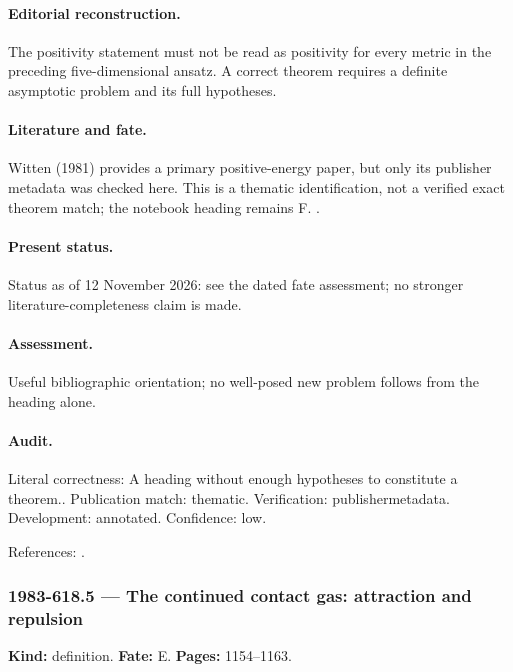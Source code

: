 \paragraph{Editorial reconstruction.} The positivity statement must not be read as positivity for every metric in the preceding five-dimensional ansatz. A correct theorem requires a definite asymptotic problem and its full hypotheses.

\paragraph{Literature and fate.} Witten (1981) provides a primary positive-energy paper, but only its publisher metadata was checked here. This is a thematic identification, not a verified exact theorem match; the notebook heading remains F. \citep{witten1981positive}.

\paragraph{Present status.} Status as of 12 November 2026: see the dated fate assessment; no stronger literature-completeness claim is made.

\paragraph{Assessment.} Useful bibliographic orientation; no well-posed new problem follows from the heading alone.

\paragraph{Audit.} Literal correctness: A heading without enough hypotheses to constitute a theorem.. Publication match: thematic. Verification: publishermetadata. Development: annotated. Confidence: low.

\noindent References: \citep{witten1981positive}.\par

\subsubsection{1983-618.5 --- The continued contact gas: attraction and repulsion}

\label{item:1983-618.5}

\noindent\textbf{Kind:} definition. \textbf{Fate:} E. \textbf{Pages:} 1154--1163.\par

